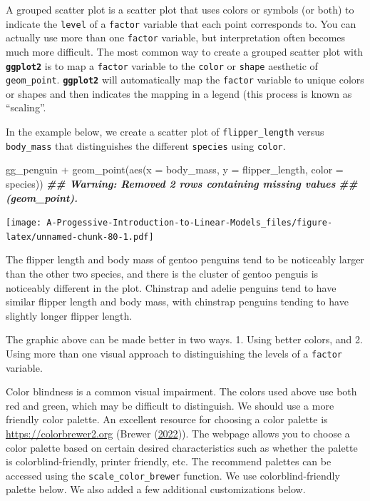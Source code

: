 \documentclass[
]{book}
\newenvironment{Shaded}{\begin{snugshade}}{\end{snugshade}}
\newcommand{\AttributeTok}[1]{\textcolor[rgb]{0.77,0.63,0.00}{#1}}
\newcommand{\DocumentationTok}[1]{\textcolor[rgb]{0.56,0.35,0.01}{\textbf{\textit{#1}}}}
\newcommand{\FunctionTok}[1]{\textcolor[rgb]{0.00,0.00,0.00}{#1}}
\newcommand{\NormalTok}[1]{#1}
\newcommand{\SpecialCharTok}[1]{\textcolor[rgb]{0.00,0.00,0.00}{#1}}
\theoremstyle{definition}
\theoremstyle{definition}
\theoremstyle{definition}
\theoremstyle{definition}
\theoremstyle{remark}
\begin{document}
A grouped scatter plot is a scatter plot that uses colors or symbols (or both) to indicate the \texttt{level} of a \texttt{factor} variable that each point corresponds to. You can actually use more than one \texttt{factor} variable, but interpretation often becomes much more difficult. The most common way to create a grouped scatter plot with \textbf{\texttt{ggplot2}} is to map a \texttt{factor} variable to the \texttt{color} or \texttt{shape} aesthetic of \texttt{geom\_point}. \textbf{\texttt{ggplot2}} will automatically map the \texttt{factor} variable to unique colors or shapes and then indicates the mapping in a legend (this process is known as ``scaling''.

In the example below, we create a scatter plot of \texttt{flipper\_length} versus \texttt{body\_mass} that distinguishes the different \texttt{species} using \texttt{color}.

\begin{Shaded}
\begin{Highlighting}[]
\NormalTok{gg\_penguin }\SpecialCharTok{+} \FunctionTok{geom\_point}\NormalTok{(}\FunctionTok{aes}\NormalTok{(}\AttributeTok{x =}\NormalTok{ body\_mass, }\AttributeTok{y =}\NormalTok{ flipper\_length,}
                            \AttributeTok{color =}\NormalTok{ species))}
\DocumentationTok{\#\# Warning: Removed 2 rows containing missing values}
\DocumentationTok{\#\# (geom\_point).}
\end{Highlighting}
\end{Shaded}

\texttt{[image: A-Progessive-Introduction-to-Linear-Models\_files/figure-latex/unnamed-chunk-80-1.pdf]}

The flipper length and body mass of gentoo penguins tend to be noticeably larger than the other two species, and there is the cluster of gentoo penguis is noticeably different in the plot. Chinstrap and adelie penguins tend to have similar flipper length and body mass, with chinstrap penguins tending to have slightly longer flipper length.

The graphic above can be made better in two ways. 1. Using better colors, and 2. Using more than one visual approach to distinguishing the levels of a \texttt{factor} variable.

Color blindness is a common visual impairment. The colors used above use both red and green, which may be difficult to distinguish. We should use a more friendly color palette. An excellent resource for choosing a color palette is \url{https://colorbrewer2.org} (Brewer (\protect\hyperlink{ref-brewer}{2022})). The webpage allows you to choose a color palette based on certain desired characteristics such as whether the palette is colorblind-friendly, printer friendly, etc. The recommend palettes can be accessed using the \texttt{scale\_color\_brewer} function. We use colorblind-friendly palette below. We also added a few additional customizations below.
\end{document}
